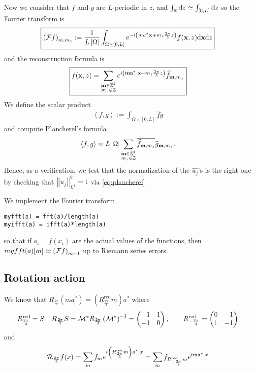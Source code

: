 \documentclass[11pt,a4paper,reqno,french,tikz]{amsart}
\def\d{{\rm d}}
\newcommand{\pa}[1]{\left( #1 \right)} %
\newcommand{\ab}[1]{\left|#1\right|} %
\newcommand{\ps}[1]{\left< #1 \right>} %
\newcommand{\nor}[2]{ \left| \! \left| #1 \right| \! \right|_{#2} } %
\newcommand{\f}[2]{\frac{#1}{#2}} %
\newcommand{\mat}[1]{\begin{pmatrix} #1 \end{pmatrix}} %
\def\ba{{\mathbf a}}
\def\bx{{\mathbf x}}
\def\bmm{{\mathbf m}}
\begin{document}
Now we consider that $f$ and $g$ are $L$-periodic in $z$, and $\int_\R \d z \simeq \int_{[0,L]} \d z$ so the Fourier transform is
\begin{align*}
	\boxed{\pa{\cF f}_{m,m_z} := \f{1}{L\ab{\Omega}} \int_{\Omega\times [0,L]} e^{-i\pa{ma^* \bx + m_z \f{2\pi}{L} z}} f(\bx,z) \d \bx \d z}
\end{align*}
and the reconstruction formula is
\begin{align}\label{eq:dec_four}
\boxed{f(\bx,z) =  \sum_{\substack{\bmm \in \Z^2 \\ m_z \in \Z}}  e^{i\pa{\bmm \ba^* \cdot \bx + m_z \f{2\pi}L z}} \widehat{f}_{\bmm,m_z}}
\end{align}
We define the scalar product
\begin{align*}
\ps{f,g} := \int_{\Omega\times [0,L]} \overline{f}g
\end{align*}
and compute Plancherel's formula
\begin{align}\label{eq:plancherel}
\ps{f,g} = L\ab{\Omega} \sum_{\substack{\bmm \in \Z^2 \\ m_z \in \Z}} \overline{\widehat{f}_{\bmm,m_z}} \widehat{g}_{\bmm,m_z}.
\end{align}
Hence, as a verification, we test that the normalization of the $\widehat{u_j}$'s is the right one by checking that $\nor{u_j}{L^2}^2 = 1$ via \eqref{eq:plancherel}.

We implement the Fourier transform
\begin{lstlisting}
myfft(a) = fft(a)/length(a)
myifft(a) = ifft(a)*length(a)
\end{lstlisting}
so that if $a_i = f(x_i)$ are the actual values of the functions, then $myfft(a)[m] \simeq \pa{\cF f}_{m-1}$ up to Riemann series errors.


\subsection{Rotation action}%
\label{sub:rotation_action}


We know that $R_{\f{2\pi}3} \pa{ma^* } = \pa{R_{\f{2\pi}3}^{\text{red}} m} a^*$ where
\begin{align*}
	R_{\f{2\pi}3}^{\text{red}} = S^{-1} R_{\f{2\pi}3} S =  \cM^* R_{\f{2\pi}3} \pa{\cM^*}^{-1} = \mat{-1 & 1 \\ -1 & 0}, \qquad R_{-\f{2\pi}3}^{\text{red}} = \mat{0 & -1 \\ 1 & -1}
\end{align*}
and
\begin{align*}
\cR_{\f{2\pi}3} f(x) = \sum_m f_m e^{i \pa{R_{\f{2\pi}3}^{\text{red}} m} a^* \cdot x} = \sum_m f_{R_{-\f{2\pi}3}^{\text{red}} m} e^{im a^* \cdot x}
\end{align*}
\end{document}
